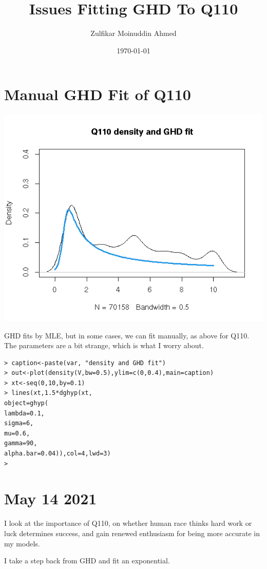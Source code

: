 \documentclass{amsart}
\title{Issues Fitting GHD To Q110}
\author{Zulfikar Moinuddin Ahmed}
\date{\today}
\begin{document}
\maketitle

\section{Manual GHD Fit of Q110}

\includegraphics[scale=0.7]{handfitq110.jpeg}

GHD fits by MLE, but in some cases, we can fit manually, as above for Q110.  The parameters are a bit strange, which is what I worry about.

\begin{verbatim}
> caption<-paste(var, "density and GHD fit")
> out<-plot(density(V,bw=0.5),ylim=c(0,0.4),main=caption)
> xt<-seq(0,10,by=0.1)
> lines(xt,1.5*dghyp(xt,
object=ghyp(
lambda=0.1,
sigma=6,
mu=0.6,
gamma=90,
alpha.bar=0.04)),col=4,lwd=3)
> 
\end{verbatim}


\section{May 14 2021}

I look at the importance of Q110, on whether human race thinks hard work or luck determines success, and gain renewed enthusiasm for being more accurate in my models.

I take a step back from GHD and fit an exponential.
\end{document}
